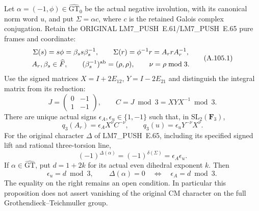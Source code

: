 Let \(\alpha=(-1,\phi)\in\widehat{\mathrm{GT}}_0\) be the actual
negative involution, with its canonical norm word \(u\), and put
\(\Sigma=\alpha c\), where \(c\) is the retained Galois complex
conjugation. Retain the ORIGINAL LM7\_PUSH~E.61/LM7\_PUSH~E.65 pure frames and coordinate:
\[
\begin{gathered}
 \Sigma(s)=s\phi=\beta_s s\beta_s^{-1},\qquad
 \Sigma(r)=\phi^{-1}r=A_r rA_r^{-1},\\
 A_r,\beta_s\in\widehat F,\qquad
 (\beta_s^{-1})^{\rm ab}=(\rho,\rho),\qquad \nu=\rho\bmod3.
\end{gathered}
\tag{A.105.1}
\]
Use the signed matrices \(X=I+2E_{12}\), \(Y=I-2E_{21}\) and
distinguish the integral matrix from its reduction:
\[
 J=\begin{pmatrix}0&-1\\1&-1\end{pmatrix},\qquad
 C=J\bmod3=XYX^{-1}\bmod3.
\tag{A.105.2}
\]
There are unique actual signs \(\epsilon_A,\epsilon_u\in\{1,-1\}\)
such that, in \(\mathrm{SL}_2(\mathbf F_3)\),
\[
 q_3(A_r)=\epsilon_A X^\nu C^{-\nu},\qquad
 q_3(u)=\epsilon_uY^{-\nu}X^\nu.
\tag{A.105.3}
\]
For the original character \(\Delta\) of LM7\_PUSH~E.65, including its
specified signed lift and rational three-torsion line,
\[
 \boxed{\,(-1)^{\Delta(\alpha)}
       =(-1)^{\delta(\Sigma)}=\epsilon_A\epsilon_u.\,}
\tag{A.105.4}
\]
If \(\alpha\in\widehat{\mathrm{GT}}\), put
\(d=1+2k\) for its actual even dihedral exponent \(k\). Then
\[
 \epsilon_u=d\bmod3,\qquad
 \boxed{\,\Delta(\alpha)=0
       \quad\Longleftrightarrow\quad \epsilon_A=d\bmod3.\,}
\tag{A.105.5}
\]
The equality on the right remains an open condition. In particular
this proposition does not assert vanishing of the original CM
character on the full Grothendieck--Teichmuller group.

